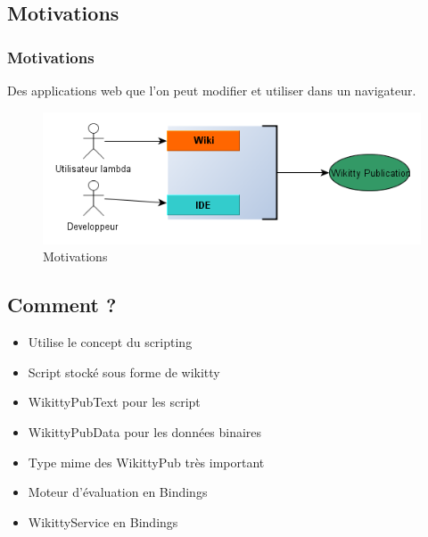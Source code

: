 \documentclass[12pt,a4paper,utf8x]{beamer}
\begin{document}
\subsection*{Motivations}
\begin{frame}\frametitle{Motivations}

Des applications web que l'on peut modifier et utiliser dans un navigateur.\pause


\begin{figure}\pause
\includegraphics[scale=0.5]{../image/wpwhy.png} 
\caption{Motivations}
\end{figure}

\end{frame}

\subsection*{Comment ?}
\begin{frame} 
\begin{itemize}
\item Utilise le concept du scripting
\item Script stocké sous forme de wikitty
\item WikittyPubText pour les script
\item WikittyPubData pour les données binaires
\item Type mime des WikittyPub très important
\item Moteur d'évaluation en Bindings
\item WikittyService en Bindings
\end{itemize}

\end{frame}
\end{document}
